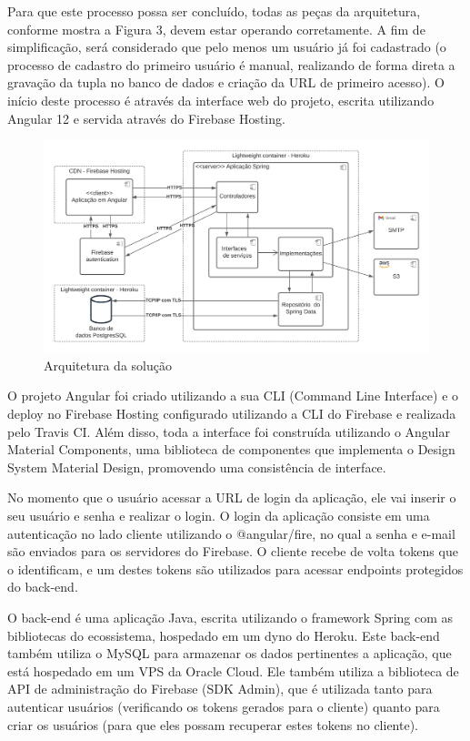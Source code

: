 \documentclass[
    12pt,               %
    openright,          %
    oneside,
    a4paper,            %
    english,            %
    brazil              %
    ]{ifsp-spo-inf-ctds} %
\begin{document}
Para que este processo possa ser concluído, todas as peças da arquitetura, conforme mostra a Figura 3, devem estar operando corretamente. A fim de simplificação, será considerado que pelo menos um usuário já foi cadastrado (o processo de cadastro do primeiro usuário é manual, realizando de forma direta a gravação da tupla no banco de dados e criação da URL de primeiro acesso). O início deste processo é através da interface web do projeto, escrita utilizando Angular 12 e servida através do Firebase Hosting.

\begin{figure}[htb]
    \centering
	\includegraphics[width=16cm]{imagens/Arquitetura.png}
	\caption{Arquitetura da solução}
\end{figure}
\FloatBarrier

O projeto Angular foi criado utilizando a sua CLI (Command Line Interface) e o deploy no Firebase Hosting configurado utilizando a CLI do Firebase e realizada pelo Travis CI. Além disso, toda a interface foi construída utilizando o Angular Material Components, uma biblioteca de componentes que implementa o Design System Material Design, promovendo uma consistência de interface.

No momento que o usuário acessar a URL de login da aplicação, ele vai inserir o seu usuário e senha e realizar o login. O login da aplicação consiste em uma autenticação no lado cliente utilizando o @angular/fire, no qual a senha e e-mail são enviados para os servidores do Firebase. O cliente recebe de volta tokens que o identificam, e um destes tokens são utilizados para acessar endpoints protegidos do back-end.

O back-end é uma aplicação Java, escrita utilizando o framework Spring com as bibliotecas do ecossistema, hospedado em um dyno do Heroku. Este back-end também utiliza o MySQL para armazenar os dados pertinentes a aplicação, que está hospedado em um VPS da Oracle Cloud. Ele também utiliza a biblioteca de API de administração do Firebase (SDK Admin), que é utilizada tanto para autenticar usuários (verificando os tokens gerados para o cliente) quanto para criar os usuários (para que eles possam recuperar estes tokens no cliente).
\end{document}
